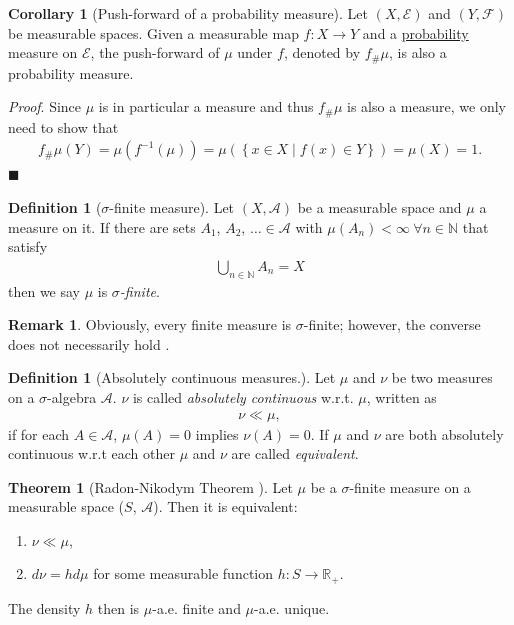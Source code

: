 \documentclass[12pt, a4paper]{article}
\numberwithin{equation}{section}
\theoremstyle{definition}
\theoremstyle{definition}
\newtheorem{defn}[thm]{Definition} %
\newtheorem{remark}[thm]{Remark} %
\newtheorem{theorem}[thm]{Theorem}
\newtheorem{corollary}[thm]{Corollary}
\begin{document}
	\begin{corollary}[Push-forward of a probability measure]
		Let $(X, \mathcal E)$ and $(Y, \mathcal F)$	be measurable spaces. Given a measurable map $f: X\rightarrow Y$ and a \underline{probability} measure on $\mathcal E$, the push-forward of $\mu$ under $f$, denoted by $f_{\#}\mu$, is also a probability measure. 
	\end{corollary}
	\noindent\textit{Proof}. Since $\mu$ is in particular a measure and thus $f_{\#}\mu$ is also a measure, we only need to show that  
	\begin{align}
		f_{\#}\mu(Y) = \mu\left(f^{-1}\left(\mu\right)\right) = \mu\left(\left\{ x\in X \mid f(x)\in Y  \right\}\right) = \mu(X) = 1. 
	\end{align}
	\qquad\qquad\qquad\qquad\qquad\qquad\qquad\qquad\qquad\qquad\qquad\qquad\qquad\qquad\qquad\qquad\qquad\qquad\qquad\qquad\qquad\quad$\blacksquare$
	
	\begin{defn}[$\sigma$-finite measure] Let $(X, \mathcal A)$ be a measurable space and $\mu$ a measure on it. If there are sets $A_1$, $A_2$, $\dots \in \mathcal A$ with $\mu(A_n) < \infty \ \forall n\in \mathbb N$ that satisfy 
	\begin{align}
		\bigcup_{n\in\mathbb N}A_n = X
	\end{align}  
	then we say $\mu$ is \textit{$\sigma$-finite}. 
	\end{defn}

	\begin{remark}
		Obviously, every finite measure is $\sigma$-finite; however, the converse does not necessarily hold \cite{sigma-finite}. 
	\end{remark}
	
	
	\begin{defn}[Absolutely continuous measures.] 
	Let $\mu$ and $\nu$ be two measures on a $\sigma$-algebra $\mathcal A$. $\nu$ is called \textit{absolutely continuous} w.r.t. $\mu$, written as 
		\begin{align}
			\nu \ll \mu, 
		\end{align}
	if for each $A\in \mathcal A$, $\mu(A) = 0$ implies $\nu(A) = 0$. If $\mu$ and $\nu$ are both absolutely continuous w.r.t each other $\mu$ and $\nu$ are called \textit{equivalent}. 
	\end{defn}

	\begin{theorem}[Radon-Nikodym Theorem \cite{measure-integration}]
	Let $\mu$ be a $\sigma$-finite measure on a measurable space ($S$, $\mathcal{A}$). Then it is equivalent: 
		\begin{enumerate}
			\item $\nu \ll \mu$, 
			\item $d\nu = hd\mu$ for some measurable function $h: S\rightarrow \mathbb R_{+}$. 
		\end{enumerate}
	The density $h$ then is $\mu$-a.e. finite and $\mu$-a.e. unique. 
	\end{theorem}
	
\end{document}
